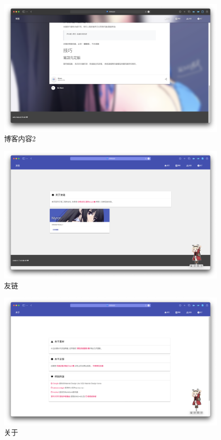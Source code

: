 \documentclass[12pt]{ctexart}
\begin{document}
\begin{figure}[!htb]
  \centering
  \includegraphics[width=1\textwidth]{pics/show_blog_2.png}
  \caption{博客内容2}
  \label{fig:show_blog_2}
\end{figure}

\begin{figure}[!htb]
  \centering
  \includegraphics[width=1\textwidth]{pics/show_link.png}
  \caption{友链}
  \label{fig:show_link}
\end{figure}

\begin{figure}[!htb]
  \centering
  \includegraphics[width=1\textwidth]{pics/show_about.png}
  \caption{关于}
  \label{fig:show_about}
\end{figure}
\end{document}
